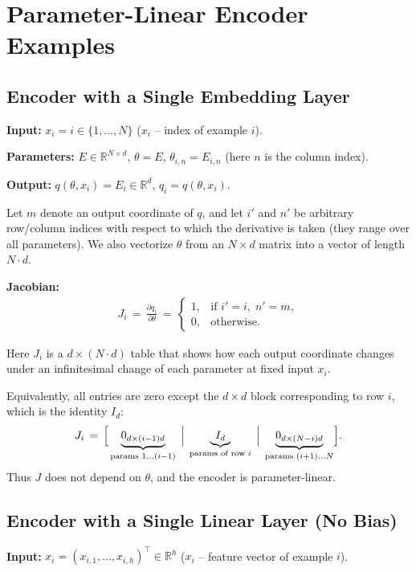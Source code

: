 \section{Parameter-Linear Encoder Examples}\label{app:encoders}

\subsection{Encoder with a Single Embedding Layer}\label{app:embed}
\textbf{Input:} $x_i = i \in \{1,\dots,N\}$ \;($x_i$ -- index of example $i$).

\textbf{Parameters:} $E\in\mathbb{R}^{N\times d}$, \;$\theta=E$, \;$\theta_{i,n}=E_{i,n}$ \;(here $n$ is the column index).

\textbf{Output:} $q(\theta,x_i)=E_i\in\mathbb{R}^{d}$, \;$q_i = q(\theta,x_i)$.

Let $m$ denote an output coordinate of $q$, and let $i'$ and $n'$ be arbitrary row/column indices with respect to which the derivative is taken (they range over all parameters). We also vectorize $\theta$ from an $N\times d$ matrix into a vector of length $N\!\cdot\! d$.

\textbf{Jacobian:}
\begin{align}
J_i \,=\, \frac{\partial q_i}{\partial \theta} \,=\, \begin{cases}
1, & \text{if } i' = i,\; n' = m,\\
0, & \text{otherwise.}
\end{cases}
\end{align}

Here $J_i$ is a $d \times (N\!\cdot\! d)$ table that shows how each output coordinate changes under an infinitesimal change of each parameter at fixed input $x_i$.

Equivalently, all entries are zero except the $d\times d$ block corresponding to row $i$, which is the identity $I_d$:
\begin{align}
J_i \,=\, \Bigl[\, \underbrace{0_{d\times (i-1)d}}_{\text{params }1\ldots(i-1)} \;\Big|\; \underbrace{I_d}_{\text{params of row }i} \;\Big|\; \underbrace{0_{d\times (N-i)d}}_{\text{params }(i+1)\ldots N} \Bigr].
\end{align}
Thus $J$ does not depend on $\theta$, and the encoder is parameter-linear.

\subsection{Encoder with a Single Linear Layer (No Bias)}\label{app:linear}
\textbf{Input:} $x_i = (x_{i,1},\dots,x_{i,h})^{\!\top} \in \mathbb{R}^{h}$ \;($x_i$ -- feature vector of example $i$).

